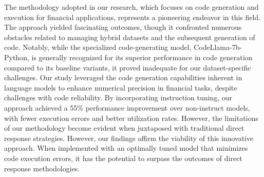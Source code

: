 \documentclass[logo,msc]{infthesis}           %
\begin{document}
The methodology adopted in our research, which focuses on code generation and execution for financial applications, represents a pioneering endeavor in this field. The approach yielded fascinating outcomes, though it confronted numerous obstacles related to managing hybrid datasets and the subsequent generation of code. Notably, while the specialized code-generating model, CodeLlama-7b-Python, is generally recognized for its superior performance in code generation compared to its baseline variants, it proved inadequate for our dataset-specific challenges. Our study leveraged the code generation capabilities inherent in language models to enhance numerical precision in financial tasks, despite challenges with code reliability. By incorporating instruction tuning, our approach achieved a 55\% performance improvement over non-instruct models, with fewer execution errors and better utilization rates. However, the limitations of our methodology become evident when juxtaposed with traditional direct response strategies. However, our findings affirm the viability of this innovative approach. When implemented with an optimally tuned model that minimizes code execution errors, it has the potential to surpass the outcomes of direct response methodologies. 
\end{document}
